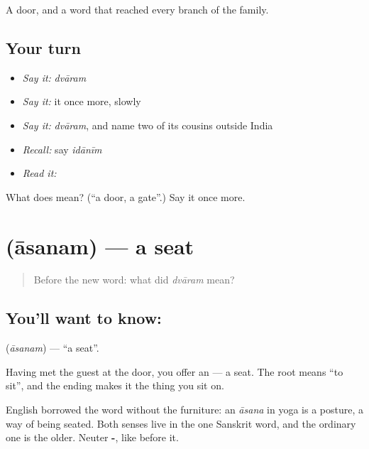 \begin{grammarlens}[title={What you've built}]
A door, and a word that reached every branch of the family.
\end{grammarlens}

\subsection*{Your turn}
\begin{itemize}
\raggedright
  \item \emph{Say it:} \emph{dvāram}
  \item \emph{Say it:} it once more, slowly
  \item \emph{Say it:} \emph{dvāram}, and name two of its cousins outside India
  \item \emph{Recall:} say \emph{idānīm}
  \item \emph{Read it:} \textbf{}
\end{itemize}

\begin{tcolorbox}[breakable,colback=teal!4,colframe=teal!35!black,title={Before you move on}]
What does  mean? (\textquotedblleft{}a door, a gate\textquotedblright{}.) Say it once more.
\end{tcolorbox}
\section[\texorpdfstring{\sk{आसनम्} (āsanam)}{आसनम् (āsanam)}]{ (āsanam) — a seat}

\label{lesson:SA-C30-seat}



\begin{quote}
Before the new word: what did \emph{dvāram} mean?
\end{quote}

\subsection*{You'll want to know: }
\textbf{} (\emph{āsanam}) — \textquotedblleft{}a seat\textquotedblright{}.

Having met the guest at the door, you offer an \textbf{} — a seat. The root means \textquotedblleft{}to sit\textquotedblright{}, and the ending makes it the thing you sit on.

English borrowed the word without the furniture: an \emph{āsana} in yoga is a posture, a way of being seated. Both senses live in the one Sanskrit word, and the ordinary one is the older. Neuter \textbf{-}, like  before it.

